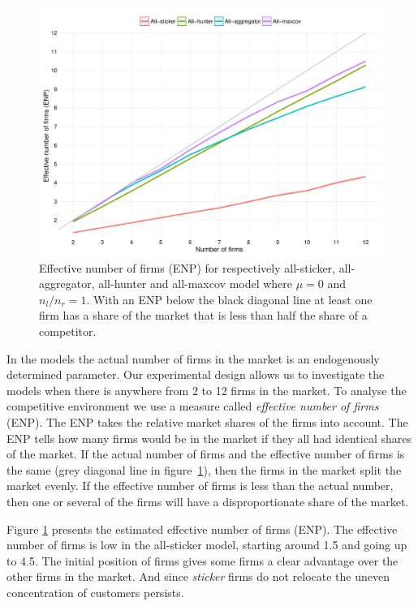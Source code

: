 \documentclass[preprint, 12pt]{elsarticle}
\begin{document}
\begin{figure}[ht!]
	\centering
	\includegraphics[width=\textwidth]{Graphics/fig22a.pdf}
	\caption{Effective number of firms (ENP) for respectively all-sticker, all-aggregator, all-hunter and all-maxcov model where $\mu=0$ and $n_l/n_r=1$. With an ENP below the black diagonal line at least one firm has a share of the market that is less than half the share of a competitor.}
	\label{fig:enp}
\end{figure}

In the models the actual number of firms in the market is an endogenously determined parameter. Our experimental design allows us to investigate the models when there is anywhere from 2 to 12 firms in the market. To analyse the competitive environment we use a measure called \emph{effective number of firms} (ENP). The ENP takes the relative market shares of the firms into account. The ENP tells how many firms would be in the market if they all had identical shares of the market. If the actual number of firms and the effective number of firms is the same (grey diagonal line in figure~\ref{fig:enp}), then the firms in the market split the market evenly. If the effective number of firms is less than the actual number, then one or several of the firms will have a disproportionate share of the market.

Figure \ref{fig:enp} presents the estimated effective number of firms (ENP). The effective number of firms is low in the all-sticker model, starting around 1.5 and going up to 4.5. The initial position of firms gives some firms a clear advantage over the other firms in the market. And since \emph{sticker} firms do not relocate the uneven concentration of customers persists.
\end{document}
